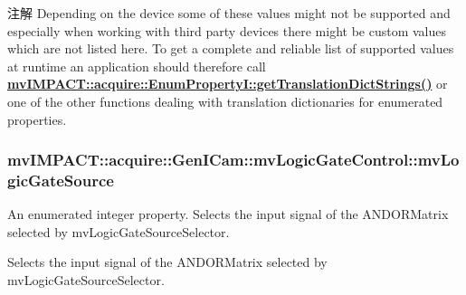 \begin{DoxyNote}{注解}
Depending on the device some of these values might not be supported and especially when working with third party devices there might be custom values which are not listed here. To get a complete and reliable list of supported values at runtime an application should therefore call {\bfseries \hyperlink{classmv_i_m_p_a_c_t_1_1acquire_1_1_enum_property_i_a0ba6ccbf5ee69784d5d0b537924d26b6}{mv\+I\+M\+P\+A\+C\+T\+::acquire\+::\+Enum\+Property\+I\+::get\+Translation\+Dict\+Strings()}} or one of the other functions dealing with translation dictionaries for enumerated properties. 
\end{DoxyNote}
\hypertarget{classmv_i_m_p_a_c_t_1_1acquire_1_1_gen_i_cam_1_1mv_logic_gate_control_a6d479832eb171e652ee95de12a1b5117}{
\subsubsection[{mv\+Logic\+Gate\+Source}]{ mv\+I\+M\+P\+A\+C\+T\+::acquire\+::\+Gen\+I\+Cam\+::mv\+Logic\+Gate\+Control\+::mv\+Logic\+Gate\+Source}}\label{classmv_i_m_p_a_c_t_1_1acquire_1_1_gen_i_cam_1_1mv_logic_gate_control_a6d479832eb171e652ee95de12a1b5117}


An enumerated integer property. Selects the input signal of the A\+N\+D\+O\+R\+Matrix selected by mv\+Logic\+Gate\+Source\+Selector. 

Selects the input signal of the A\+N\+D\+O\+R\+Matrix selected by mv\+Logic\+Gate\+Source\+Selector.

